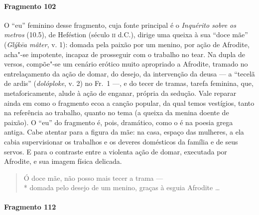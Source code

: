 \paragraph{Fragmento 102}

{\small O “eu” feminino desse fragmento, cuja fonte principal é o \textit{Inquérito
sobre os metros} (10.5), de Heféstion (século \textsc{ii} d.C.), dirige uma queixa à sua
“doce mãe” (\textit{Glýkēa mâter}, v. 1): domada pela paixão por um menino, por ação de Afrodite, acha"-se impotente, incapaz de prosseguir com o trabalho no tear. Na dupla de
versos, compõe"-se um cenário erótico muito apropriado a Afrodite, tramado no
entrelaçamento da ação de domar, do desejo, da intervenção da deusa
--- a ``tecelã de ardis” (\textit{dolóploke}, v. 2) no Fr.~1 ---, e do tecer de tramas, tarefa feminina, que, metaforicamente, alude à ação de enganar, própria da sedução.
Vale reparar ainda em como o fragmento ecoa a canção popular, da qual
temos vestígios, tanto na referência ao trabalho, quanto no tema (a queixa da
menina doente de paixão). O “eu” do fragmento é, pois, dramático, como o é
na poesia grega antiga. Cabe atentar para a figura da mãe: na
casa, espaço das mulheres, a ela cabia supervisionar os trabalhos e os deveres
domésticos da família e de seus servos. E para o contraste entre a violenta
ação de domar, executada por Afrodite, e sua imagem física delicada.}

\begin{verse}
Ó doce mãe, não posso mais tecer a trama --- \\*
domada pelo desejo de um menino, graças à esguia \qb{}Afrodite \ldots{}
\end{verse}


\paragraph{Fragmento 112}


